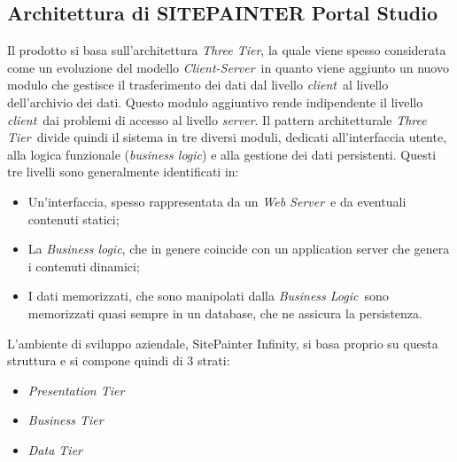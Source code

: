\subsection{Architettura di SITEPAINTER Portal Studio}
Il prodotto si basa sull'architettura \textit{Three Tier}, la quale viene spesso considerata come un evoluzione del modello \textit{Client-Server}\ in quanto viene aggiunto un nuovo modulo che gestisce il trasferimento dei dati dal livello \textit{client}\ al livello dell'archivio dei dati. Questo modulo aggiuntivo rende indipendente il livello \textit{client}\ dai problemi di accesso al livello \textit{server}. Il pattern architetturale \textit{Three Tier}\ divide quindi il sistema in tre diversi moduli, dedicati all'interfaccia utente, alla logica funzionale (\textit{business logic}) e alla gestione dei dati persistenti. Questi tre livelli sono generalmente identificati in:
\begin{itemize}
\item Un'interfaccia, spesso rappresentata da un \textit{Web Server}\ e da eventuali contenuti statici;
\item La \textit{Business logic}, che in genere coincide con un application server che genera i contenuti dinamici;
\item I dati memorizzati, che sono manipolati dalla \textit{Business Logic}\ sono memorizzati quasi sempre in un database, che ne assicura la persistenza.
\end{itemize}
L'ambiente di sviluppo aziendale, SitePainter Infinity, si basa proprio su questa struttura e si
compone quindi di 3 strati:
\begin{itemize}
\item \textit{Presentation Tier}
\item \textit{Business Tier}
\item \textit{Data Tier}
\end{itemize}
